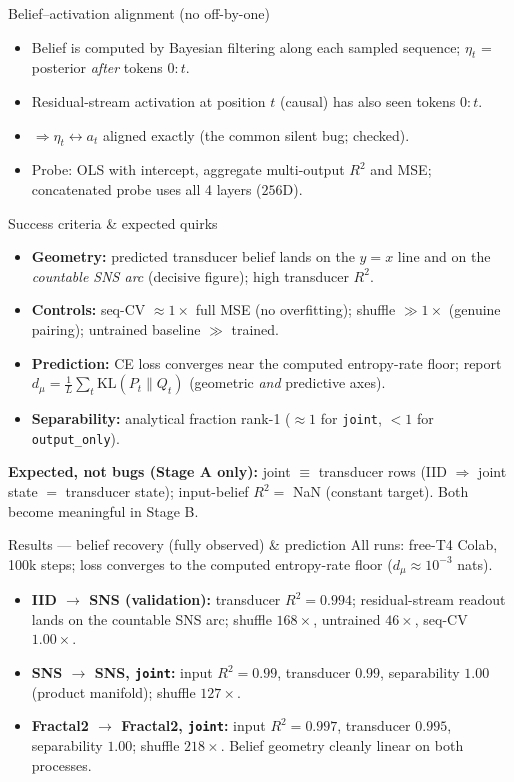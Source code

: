 \documentclass[aspectratio=169]{beamer}
\begin{document}
\begin{frame}{Belief--activation alignment (no off-by-one)}
\begin{itemize}
  \item Belief is computed by Bayesian filtering along each sampled sequence;
        $\eta_t$ = posterior \emph{after} tokens $0{:}t$.
  \item Residual-stream activation at position $t$ (causal) has also seen tokens $0{:}t$.
  \item $\Rightarrow \eta_t \leftrightarrow a_t$ aligned exactly (the common silent bug; checked).
  \item Probe: OLS with intercept, aggregate multi-output $R^2$ and MSE; concatenated probe uses
        all 4 layers ($256$D).
\end{itemize}
\end{frame}

\begin{frame}{Success criteria \& expected quirks}
\begin{itemize}
  \item \textbf{Geometry:} predicted transducer belief lands on the $y=x$ line and on the
        \emph{countable SNS arc} (decisive figure); high transducer $R^2$.
  \item \textbf{Controls:} seq-CV $\approx 1\times$ full MSE (no overfitting); shuffle $\gg 1\times$
        (genuine pairing); untrained baseline $\gg$ trained.
  \item \textbf{Prediction:} CE loss converges near the computed entropy-rate floor; report
        $d_\mu = \tfrac1L\sum_t \mathrm{KL}(P_t\|Q_t)$ (geometric \emph{and} predictive axes).
  \item \textbf{Separability:} analytical fraction rank-1 ($\approx 1$ for \texttt{joint}, $<1$ for \texttt{output\_only}).
\end{itemize}
\vspace{2mm}
\textbf{Expected, not bugs (Stage A only):} joint $\equiv$ transducer rows (IID $\Rightarrow$ joint
state $=$ transducer state); input-belief $R^2 = $ NaN (constant target). Both become meaningful in
Stage B.
\end{frame}

\begin{frame}{Results --- belief recovery (fully observed) \& prediction}
All runs: free-T4 Colab, 100k steps; loss converges to the computed entropy-rate floor
($d_\mu \approx 10^{-3}$ nats).
\begin{itemize}
  \item \textbf{IID $\to$ SNS (validation):} transducer $R^2 = 0.994$; residual-stream readout lands
        on the countable SNS arc; shuffle $168\times$, untrained $46\times$, seq-CV $1.00\times$.
  \item \textbf{SNS $\to$ SNS, \texttt{joint}:} input $R^2{=}0.99$, transducer $0.99$, separability $1.00$
        (product manifold); shuffle $127\times$.
  \item \textbf{Fractal2 $\to$ Fractal2, \texttt{joint}:} input $R^2{=}0.997$, transducer $0.995$,
        separability $1.00$; shuffle $218\times$. Belief geometry cleanly linear on both processes.
\end{itemize}
\end{frame}
\end{document}
